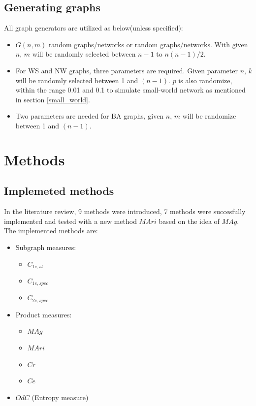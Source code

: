 \documentclass[12pt]{article}
\begin{document}
\subsection{Generating graphs}
\label{generate_graphs}
All graph generators are utilized as below(unless specified):
\begin{itemize}
    \item $G(n,m)$ random graphs/networks or random graphs/networks. With given $n$, $m$ will be randomly selected between $n-1$ to $n(n-1)/2$.
    \item For WS and NW graphs, three parameters are required. Given parameter $n$, $k$ will be randomly selected between 1 and $(n-1)$. $p$ is also randomize, within the range 0.01 and 0.1 to simulate small-world network as mentioned in section \ref{small_world}.
    \item Two parameters are needed for BA graphs, given $n$, $m$ will be randomize between 1 and $(n-1)$.
\end{itemize}

\section{Methods}
\subsection{Implemeted methods}
In the literature review\cite{litreview}, 9 methods were introduced, 7 methods were succesfully implemented and tested with a new method $MAri$ based on the idea of $MAg$. The implemented methods are:
\begin{itemize}
    \item Subgraph measures:
    \begin{itemize}
        \item $C_{1e,st}$
        \item $C_{1e,spec}$
        \item $C_{2e,spec}$
    \end{itemize}
    \item Product measures:
    \begin{itemize}
        \item $MAg$
        \item $MAri$
        \item $Cr$
        \item $Ce$
    \end{itemize}
    \item $OdC$ (Entropy measure)
\end{itemize}
\end{document}

